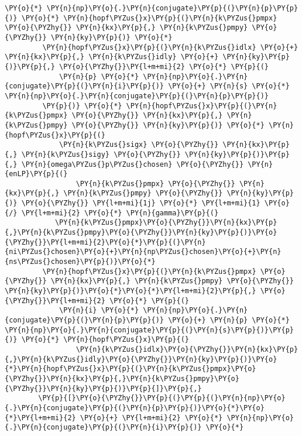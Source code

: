 \begin{Verbatim}[commandchars=\\\{\}]
         \PY{o}{*} \PY{n}{np}\PY{o}{.}\PY{n}{conjugate}\PY{p}{(}\PY{n}{p}\PY{p}{)} \PY{o}{*} \PY{n}{hopf\PYZus{}x}\PY{p}{(}\PY{n}{k\PYZus{}pmpx} \PY{o}{\PYZhy{}} \PY{n}{kx}\PY{p}{,} \PY{n}{k\PYZus{}pmpy} \PY{o}{\PYZhy{}} \PY{n}{ky}\PY{p}{)} \PY{o}{*}
         \PY{n}{hopf\PYZus{}x}\PY{p}{(}\PY{n}{k\PYZus{}idlx} \PY{o}{+} \PY{n}{kx}\PY{p}{,} \PY{n}{k\PYZus{}idly} \PY{o}{+} \PY{n}{ky}\PY{p}{)}\PY{p}{,} \PY{o}{\PYZhy{}}\PY{l+m+mi}{2} \PY{o}{*} \PY{p}{(}
             \PY{n}{p} \PY{o}{*} \PY{n}{np}\PY{o}{.}\PY{n}{conjugate}\PY{p}{(}\PY{n}{i}\PY{p}{)} \PY{o}{+} \PY{n}{s} \PY{o}{*} \PY{n}{np}\PY{o}{.}\PY{n}{conjugate}\PY{p}{(}\PY{n}{p}\PY{p}{)}
         \PY{p}{)} \PY{o}{*} \PY{n}{hopf\PYZus{}x}\PY{p}{(}\PY{n}{k\PYZus{}pmpx} \PY{o}{\PYZhy{}} \PY{n}{kx}\PY{p}{,} \PY{n}{k\PYZus{}pmpy} \PY{o}{\PYZhy{}} \PY{n}{ky}\PY{p}{)} \PY{o}{*} \PY{n}{hopf\PYZus{}x}\PY{p}{(}
             \PY{n}{k\PYZus{}sigx} \PY{o}{\PYZhy{}} \PY{n}{kx}\PY{p}{,} \PY{n}{k\PYZus{}sigy} \PY{o}{\PYZhy{}} \PY{n}{ky}\PY{p}{)}\PY{p}{,} \PY{n}{omega\PYZus{}p\PYZus{}chosen} \PY{o}{\PYZhy{}} \PY{n}{enLP}\PY{p}{(}
                 \PY{n}{k\PYZus{}pmpx} \PY{o}{\PYZhy{}} \PY{n}{kx}\PY{p}{,} \PY{n}{k\PYZus{}pmpy} \PY{o}{\PYZhy{}} \PY{n}{ky}\PY{p}{)} \PY{o}{\PYZhy{}} \PY{l+m+mi}{1j} \PY{o}{*} \PY{l+m+mi}{1} \PY{o}{/} \PY{l+m+mi}{2} \PY{o}{*} \PY{n}{gamma}\PY{p}{(}
            \PY{n}{k\PYZus{}pmpx}\PY{o}{\PYZhy{}}\PY{n}{kx}\PY{p}{,}\PY{n}{k\PYZus{}pmpy}\PY{o}{\PYZhy{}}\PY{n}{ky}\PY{p}{)}\PY{o}{\PYZhy{}}\PY{l+m+mi}{2}\PY{o}{*}\PY{p}{(}\PY{n}{ni\PYZus{}chosen}\PY{o}{+}\PY{n}{np\PYZus{}chosen}\PY{o}{+}\PY{n}{ns\PYZus{}chosen}\PY{p}{)}\PY{o}{*}
         \PY{n}{hopf\PYZus{}x}\PY{p}{(}\PY{n}{k\PYZus{}pmpx} \PY{o}{\PYZhy{}} \PY{n}{kx}\PY{p}{,} \PY{n}{k\PYZus{}pmpy} \PY{o}{\PYZhy{}} \PY{n}{ky}\PY{p}{)}\PY{o}{*}\PY{o}{*}\PY{l+m+mi}{2}\PY{p}{,} \PY{o}{\PYZhy{}}\PY{l+m+mi}{2} \PY{o}{*} \PY{p}{(}
             \PY{n}{i} \PY{o}{*} \PY{n}{np}\PY{o}{.}\PY{n}{conjugate}\PY{p}{(}\PY{n}{p}\PY{p}{)} \PY{o}{+} \PY{n}{p} \PY{o}{*} \PY{n}{np}\PY{o}{.}\PY{n}{conjugate}\PY{p}{(}\PY{n}{s}\PY{p}{)}\PY{p}{)} \PY{o}{*} \PY{n}{hopf\PYZus{}x}\PY{p}{(}
                 \PY{n}{k\PYZus{}idlx}\PY{o}{\PYZhy{}}\PY{n}{kx}\PY{p}{,}\PY{n}{k\PYZus{}idly}\PY{o}{\PYZhy{}}\PY{n}{ky}\PY{p}{)}\PY{o}{*}\PY{n}{hopf\PYZus{}x}\PY{p}{(}\PY{n}{k\PYZus{}pmpx}\PY{o}{\PYZhy{}}\PY{n}{kx}\PY{p}{,}\PY{n}{k\PYZus{}pmpy}\PY{o}{\PYZhy{}}\PY{n}{ky}\PY{p}{)}\PY{p}{]}\PY{p}{,}
        \PY{p}{[}\PY{o}{\PYZhy{}}\PY{p}{(}\PY{p}{(}\PY{n}{np}\PY{o}{.}\PY{n}{conjugate}\PY{p}{(}\PY{n}{p}\PY{p}{)}\PY{o}{*}\PY{o}{*}\PY{l+m+mi}{2} \PY{o}{+} \PY{l+m+mi}{2} \PY{o}{*} \PY{n}{np}\PY{o}{.}\PY{n}{conjugate}\PY{p}{(}\PY{n}{i}\PY{p}{)} \PY{o}{*}

\end{Verbatim}
